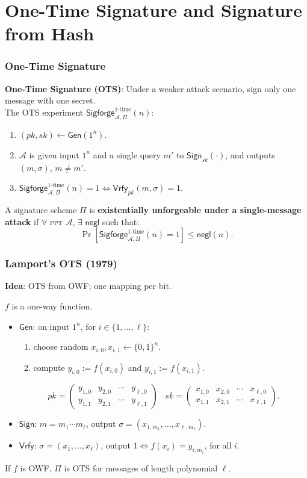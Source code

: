 \section{One-Time Signature and Signature from Hash}
\begin{frame}\frametitle{One-Time Signature}
\textbf{One-Time Signature (OTS)}: Under a weaker attack scenario, sign only one message with one secret.\\
The OTS experiment $\mathsf{Sigforge}_{\mathcal{A},\Pi }^{\text{1-time}}(n)$:
\begin{enumerate}
\item $(pk,sk) \gets \mathsf{Gen}(1^n)$.
\item $\mathcal{A}$ is given input $1^n$ and a \alert{single query} $m'$ to $\mathsf{Sign}_{sk}(\cdot)$, and outputs $(m,\sigma)$, $m \neq m'$.
\item $\mathsf{Sigforge}_{\mathcal{A},\Pi }^{\text{1-time}}(n)=1 \iff \mathsf{Vrfy}_{pk}(m,\sigma)=1$. 
\end{enumerate}
\begin{definition}
A signature scheme $\Pi$ is \textbf{existentially unforgeable under a single-message attack} if $\forall$ \textsc{ppt} $\mathcal{A}$, $\exists$ $\mathsf{negl}$ such that:
\[ \Pr [\mathsf{Sigforge}_{\mathcal{A},\Pi }^{\text{1-time}}(n)=1] \le \mathsf{negl}(n).
\]
\end{definition}
\end{frame}
\begin{frame}\frametitle{Lamport's OTS (1979)}
\textbf{Idea}: OTS from OWF; one mapping per bit.
\begin{construction}
$f$ is a one-way function.
\begin{itemize}
\item $\mathsf{Gen}$: on input $1^n$, for $i \in \{1,\dotsc, \ell\}$:
\begin{enumerate}
\item choose random $x_{i,0}, x_{i,1} \gets \{0,1\}^n$.
\item compute $y_{i,0} := f(x_{i,0})$ and $y_{i,1} := f(x_{i,1})$.
\end{enumerate}
\[ pk = \begin{pmatrix} y_{1,0} & y_{2,0} & \cdots & y_{\ell,0} \\
y_{1,1} & y_{2,1} & \cdots & y_{\ell,1} \end{pmatrix}\;\;\; sk = \begin{pmatrix} x_{1,0} & x_{2,0} & \cdots & x_{\ell,0} \\
x_{1,1} & x_{2,1} & \cdots & x_{\ell,1} \end{pmatrix}. \]
\item $\mathsf{Sign}$: $m = m_1\cdots m_{\ell}$, output $\sigma = (x_{1,m_1},\dotsc,x_{\ell,m_{\ell}})$.
\item $\mathsf{Vrfy}$:  $\sigma = (x_1,\dotsc,x_{\ell})$, output $1 \iff f(x_i) = y_{i,m_i}$, for all $i$. 
\end{itemize}
\end{construction}
\begin{theorem}
If $f$ is OWF, $\Pi$ is OTS for messages of length polynomial $\ell$.
\end{theorem}
\end{frame}
